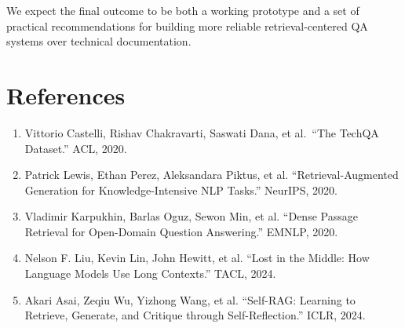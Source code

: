 \documentclass[paper=a4, fontsize=11pt]{scrartcl}
\begin{document}
We expect the final outcome to be both a working prototype and a set of practical recommendations for building more reliable retrieval-centered QA systems over technical documentation.

\section*{References}
\begin{enumerate}
\item Vittorio Castelli, Rishav Chakravarti, Saswati Dana, et al.\ ``The TechQA Dataset.'' ACL, 2020.
\item Patrick Lewis, Ethan Perez, Aleksandara Piktus, et al. ``Retrieval-Augmented Generation for Knowledge-Intensive NLP Tasks.'' NeurIPS, 2020.
\item Vladimir Karpukhin, Barlas Oguz, Sewon Min, et al. ``Dense Passage Retrieval for Open-Domain Question Answering.'' EMNLP, 2020.
\item Nelson F. Liu, Kevin Lin, John Hewitt, et al. ``Lost in the Middle: How Language Models Use Long Contexts.'' TACL, 2024.
\item Akari Asai, Zeqiu Wu, Yizhong Wang, et al. ``Self-RAG: Learning to Retrieve, Generate, and Critique through Self-Reflection.'' ICLR, 2024.
\end{enumerate}
\end{document}
